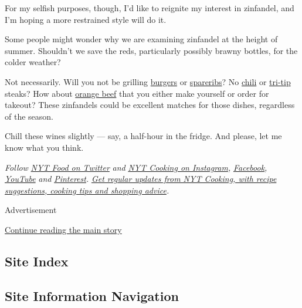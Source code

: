 For my selfish purposes, though, I'd like to reignite my interest in
zinfandel, and I'm hoping a more restrained style will do it.

Some people might wonder why we are examining zinfandel at the height of
summer. Shouldn't we save the reds, particularly possibly brawny
bottles, for the colder weather?

Not necessarily. Will you not be grilling
\href{https://cooking.nytimes.com/recipes/1016596-hamburgers-tavern-style?action=click\&module=Local\%20Search\%20Recipe\%20Card\&pgType=search\&rank=2}{burgers}
or
\href{https://cooking.nytimes.com/recipes/1014252-balsamic-glazed-oven-baked-ribs?action=click\&module=Global\%20Search\%20Recipe\%20Card\&pgType=search\&rank=2}{spareribs}?
No \href{https://cooking.nytimes.com/guides/48-how-to-make-chili}{chili}
or
\href{https://cooking.nytimes.com/recipes/1013313-santa-maria-style-grilled-tri-tip}{tri-tip}
steaks? How about
\href{https://cooking.nytimes.com/recipes/1017697-orange-beef}{orange
beef} that you either make yourself or order for takeout? These
zinfandels could be excellent matches for those dishes, regardless of
the season.

Chill these wines slightly --- say, a half-hour in the fridge. And
please, let me know what you think.

\emph{Follow} \emph{\href{https://twitter.com/nytfood}{NYT Food on
Twitter}} \emph{and}
\emph{\href{https://www.instagram.com/nytcooking/}{NYT Cooking on
Instagram},}
\emph{\href{https://www.facebook.com/nytcooking/}{Facebook},}
\emph{\href{https://www.youtube.com/nytcooking}{YouTube}} \emph{and}
\emph{\href{https://www.pinterest.com/nytcooking/}{Pinterest}.}
\emph{\href{https://www.nytimes.com/newsletters/cooking}{Get regular
updates from NYT Cooking, with recipe suggestions, cooking tips and
shopping advice}.}

Advertisement

\protect\hyperlink{after-bottom}{Continue reading the main story}

\hypertarget{site-index}{%
\subsection{Site Index}\label{site-index}}

\hypertarget{site-information-navigation}{%
\subsection{Site Information
Navigation}\label{site-information-navigation}}

